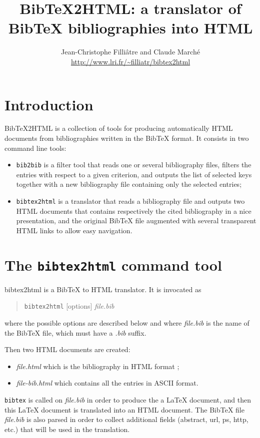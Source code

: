 \documentclass[11pt,a4paper]{article}
\newcommand{\monurl}[2]{\url{#1}}
\begin{document}
\title{BibTeX2HTML: a translator of BibTeX bibliographies into HTML}
\author{Jean-Christophe Filli\^{a}tre and Claude March\'e \\
        \normalsize\monurl{http://www.lri.fr/~filliatr/bibtex2html}{http://www.lri.fr/\~{}filliatr/bibtex2html}}
\date{}
\maketitle

\tableofcontents


\section{Introduction}

BibTeX2HTML is a collection of tools for producing automatically HTML
documents from bibliographies written in the BibTeX format. It
consists in two command line tools:
\begin{itemize}
\item \texttt{bib2bib} is a filter tool that reads one or several
  bibliography files, filters the entries with respect to a given
  criterion, and outputs the list of selected keys together with a new
  bibliography file containing only the selected entries;
\item \texttt{bibtex2html} is a translator that reads a bibliography
  file and outputs two HTML documents that contains respectively the
  cited bibliography in a nice presentation, and the original BibTeX
  file augmented with several transparent HTML links to allow easy
  navigation. 
\end{itemize}

\section{The \texttt{bibtex2html} command tool}

bibtex2html is a BibTeX to HTML translator. It is invocated as 
\begin{quote}
\texttt{bibtex2html} [options] \textit{file.bib}
\end{quote}
where the possible 
options
are described below and where
\textit{file.bib} is the name of the BibTeX file, which must have a
\textit{.bib} suffix.


Then two HTML documents are created: 
\begin{itemize}
\item \textit{file.html} which is the bibliography in HTML format
;
\item \textit{file-bib.html} which contains all the entries in ASCII
  format.
\end{itemize}
\texttt{bibtex} is called on \textit{file.bib} in order to produce the
a LaTeX document, and then this LaTeX document is translated into an
HTML document.  The BibTeX file \textit{file.bib} is also parsed in
order to collect additional fields (abstract, url, ps, http, etc.)
that will be used in the translation.
\end{document}
